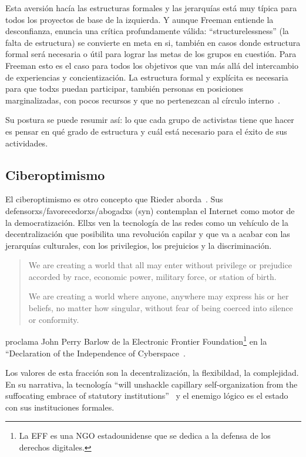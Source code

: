 Esta aversión hacía las estructuras formales y las jerarquías está muy típica para todos los proyectos de base de la izquierda.
Y aunque Freeman entiende la desconfianza, enuncia una crítica profundamente válida:
``structurelessness'' (la falta de estructura) se convierte en meta en si, también en casos donde estructura formal será necesaria o útil para lograr las metas de los grupos en cuestión.
Para Freeman esto es el caso para todos los objetivos que van más allá del intercambio de experiencias y concientización.
La estructura formal y explícita es necesaria para que todxs puedan participar, también personas en posiciones marginalizadas, con pocos recursos y que no pertenezcan al círculo interno~\autocite{Freeman1970}.

Su postura se puede resumir así: lo que cada grupo de activistas tiene que hacer es pensar en qué grado de estructura y cuál está necesario para el éxito de sus actividades.

\subsection{Ciberoptimismo}

El ciberoptimismo es otro concepto que Rieder aborda~\autocite{Rieder2012}.
Sus defensorxs/favorecedorxs/abogadxs (syn) contemplan el Internet como motor de la democratización.
Ellxs ven la tecnología de las redes como un vehículo de la decentralización que posibilita una revolución capilar y que va a acabar con las jerarquías culturales, con los privilegios, los prejuicios y la discriminación.

\begin{quotation}
We are creating a world that all may enter without privilege or prejudice accorded by race, economic power, military force, or station of birth.

We are creating a world where anyone, anywhere may express his or her beliefs, no matter how singular, without fear of being coerced into silence or conformity.
\end{quotation}
proclama John Perry Barlow de la Electronic Frontier Foundation\footnote{La EFF es una NGO estadounidense que se dedica a la defensa de los derechos digitales.} en la ``Declaration of the Independence of Cyberspace~\autocite{Barlow1996}.

Los valores de esta fracción  son la decentralización, la flexibildad, la complejidad.
En su narrativa, la tecnología ``will unshackle capillary self-organization from the suffocating embrace of statutory institutions''~\autocite{Rieder2012} y el enemigo lógico es el estado con sus instituciones formales.

